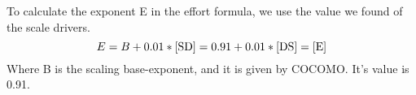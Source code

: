 To calculate the exponent E in the effort formula, we use the value we found of the scale drivers.
\begin{equation}
    E = B + 0.01 * \ref{SD} = 0.91 + 0.01 * \ref{DS} = \manuallabel{E}{1.066}\ref{E}
\end{equation}
Where B is the scaling base-exponent, and it is given by COCOMO. It's value is 0.91.